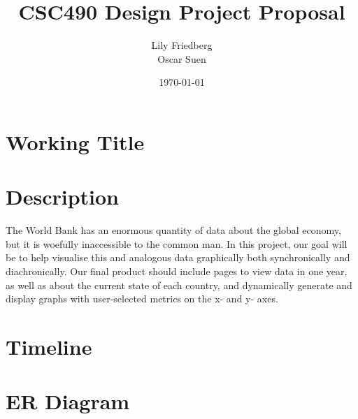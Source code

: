 \documentclass[12pt]{article}
\title{CSC490 Design Project Proposal}
\author{Lily Friedberg \\ Oscar Suen}
\date{\today}
\begin{document}
\maketitle

\section{Working Title}
\section{Description}
The World Bank has an enormous quantity of data about the global economy, but it is woefully inaccessible to the common man. In this project, our goal will be to help visualise this and analogous data graphically both synchronically and diachronically. Our final product should include pages to view data in one year, as well as about the current state of each country, and dynamically generate and display graphs with user-selected metrics on the x- and y- axes.
\section{Timeline}
\section{ER Diagram}
\end{document}
